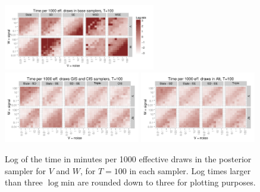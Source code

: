 \documentclass{article}
\begin{document}
\begin{figure}[!h]
\centering
\includegraphics[width=0.59\textwidth]{basecistimeplot100}
\includegraphics[width=0.53\textwidth]{altgisVtimeplot100}
\includegraphics[width=0.45\textwidth]{altgisWtimeplot100}
\caption{Log of the time in minutes per 1000 effective draws in the posterior sampler for $V$ and $W$, for $T=100$ in each sampler. Log times larger than three $\log \mathrm{min}$ are rounded down to three for plotting purposes.}
\label{baseinttimeplot2}
\end{figure}
\end{document}
